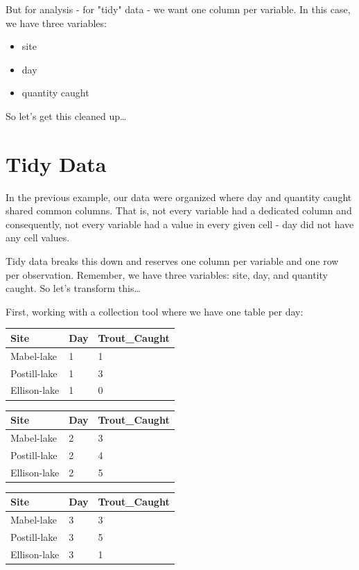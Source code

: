 \documentclass[
]{book}
\newcounter{none} %
\providecommand{\tightlist}{%
  \setlength{\itemsep}{0pt}\setlength{\parskip}{0pt}}
\begin{document}
But for analysis - for "tidy" data - we want one column per variable. In this case, we have three variables:

\begin{itemize}
\tightlist
\item
  site
\item
  day
\item
  quantity caught
\end{itemize}

So let's get this cleaned up\ldots{}

\section{Tidy Data}\label{tidy-data-1}

In the previous example, our data were organized where day and quantity caught shared common columns. That is, not every variable had a dedicated column and consequently, not every variable had a value in every given cell - day did not have any cell values.

Tidy data breaks this down and reserves one column per variable and one row per observation. Remember, we have three variables: site, day, and quantity caught. So let's transform this\ldots{}

First, working with a collection tool where we have one table per day:

{\def\LTcaptype{none} %
\begin{longtable}[]{@{}lll@{}}
\toprule\noalign{}
Site & Day & Trout\_Caught \\
\midrule\noalign{}
\endhead
\bottomrule\noalign{}
\endlastfoot
Mabel-lake & 1 & 1 \\
Postill-lake & 1 & 3 \\
Ellison-lake & 1 & 0 \\
\end{longtable}
}

{\def\LTcaptype{none} %
\begin{longtable}[]{@{}lll@{}}
\toprule\noalign{}
Site & Day & Trout\_Caught \\
\midrule\noalign{}
\endhead
\bottomrule\noalign{}
\endlastfoot
Mabel-lake & 2 & 3 \\
Postill-lake & 2 & 4 \\
Ellison-lake & 2 & 5 \\
\end{longtable}
}

{\def\LTcaptype{none} %
\begin{longtable}[]{@{}lll@{}}
\toprule\noalign{}
Site & Day & Trout\_Caught \\
\midrule\noalign{}
\endhead
\bottomrule\noalign{}
\endlastfoot
Mabel-lake & 3 & 3 \\
Postill-lake & 3 & 5 \\
Ellison-lake & 3 & 1 \\
\end{longtable}
}
\end{document}
